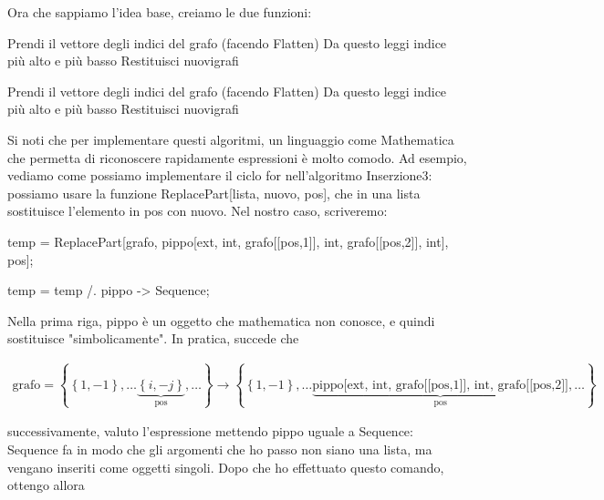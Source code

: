 \documentclass{report}
\begin{document}
Ora che sappiamo l'idea base, creiamo le due funzioni: 

\begin{algorithm}[H]
    \SetAlgoLined
    \BlankLine
    Prendi il vettore degli indici del grafo (facendo Flatten)\; 
    Da questo leggi indice più alto e più basso\; 
    Restituisci nuovigrafi\; 
\caption{Inserzione4}
\end{algorithm}

\begin{algorithm}[H]
    \SetAlgoLined
    \BlankLine
    Prendi il vettore degli indici del grafo (facendo Flatten)\; 
    Da questo leggi indice più alto e più basso\; 
    Restituisci nuovigrafi\; 
\caption{Inserzione3}
\end{algorithm}

Si noti che per implementare questi algoritmi, un linguaggio come Mathematica che permetta di riconoscere rapidamente espressioni è molto comodo. Ad esempio, vediamo come possiamo implementare il ciclo for nell'algoritmo Inserzione3: possiamo usare la funzione ReplacePart[lista, nuovo, pos], che in una lista sostituisce l'elemento in pos con nuovo. Nel nostro caso, scriveremo: 

temp = ReplacePart[grafo, pippo[{ext, int}, {grafo[[pos,1]], int}, {grafo[[pos,2]], int}], pos];

temp = temp /. {pippo -> Sequence};

Nella prima riga, pippo è un oggetto che mathematica non conosce, e quindi sostituisce "simbolicamente". In pratica, succede che 

\begin{align}
    \text{grafo} = \left\{\left\{1, -1 \right\}, \ldots \underbrace{\left\{i, -j\right\}}_{\text{pos}} , \ldots\right\} \rightarrow \left\{\left\{1, -1 \right\}, \ldots \underbrace{\text{pippo[{ext, int}, {grafo[[pos,1]], int}, {grafo[[pos,2]]}}}_{\text{pos}} , \ldots\right\}
\end{align}

successivamente, valuto l'espressione mettendo pippo uguale a Sequence: Sequence fa in modo che gli argomenti che ho passo non siano una lista, ma vengano inseriti come oggetti singoli. Dopo che ho effettuato questo comando, ottengo allora 
\end{document}
